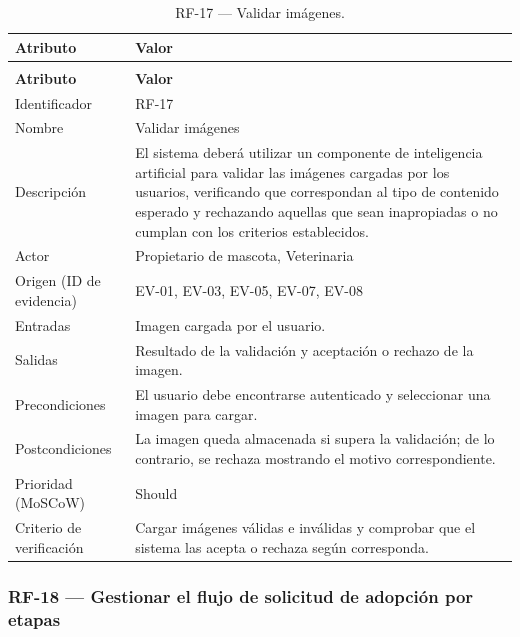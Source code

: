 \documentclass[journal,onecolumn]{IEEEtran}
\makeatletter
\newenvironment{atributos}[2]{%
	\small
	\begin{longtable}{@{}>{\raggedright\arraybackslash}p{4.2cm} >{\raggedright\arraybackslash}p{11.2cm}@{}}
		\caption{#2}\label{tab:#1}\\
		\toprule
		\textbf{Atributo} & \textbf{Valor} \\
		\midrule
		\endfirsthead
		\multicolumn{2}{@{}l}{\small\itshape (continuación)}\\
		\toprule
		\textbf{Atributo} & \textbf{Valor} \\
		\midrule
		\endhead
		\bottomrule
		\endlastfoot
	}{%
	\end{longtable}
	\normalsize
}
\makeatother
\begin{document}
	\begin{atributos}{RF-17}{RF-17 --- Validar imágenes.}
		Identificador & RF-17 \\
		Nombre & Validar imágenes \\
		Descripción & El sistema deberá utilizar un componente de inteligencia artificial para validar las imágenes cargadas por los usuarios, verificando que correspondan al tipo de contenido esperado y rechazando aquellas que sean inapropiadas o no cumplan con los criterios establecidos. \\
		Actor & Propietario de mascota, Veterinaria \\
		Origen (ID de evidencia) & EV-01, EV-03, EV-05, EV-07, EV-08 \\
		Entradas & Imagen cargada por el usuario. \\
		Salidas & Resultado de la validación y aceptación o rechazo de la imagen. \\
		Precondiciones & El usuario debe encontrarse autenticado y seleccionar una imagen para cargar. \\
		Postcondiciones & La imagen queda almacenada si supera la validación; de lo contrario, se rechaza mostrando el motivo correspondiente. \\
		Prioridad (MoSCoW) & Should \\
		Criterio de verificación & Cargar imágenes válidas e inválidas y comprobar que el sistema las acepta o rechaza según corresponda. \\
	\end{atributos}
	
	\subsubsection{RF-18 --- Gestionar el flujo de solicitud de adopción por etapas}
	
\end{document}
